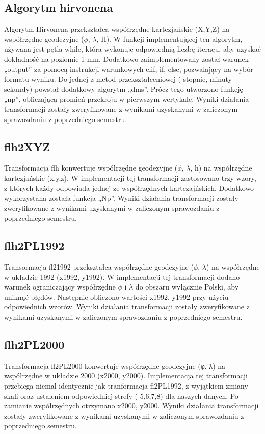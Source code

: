 \documentclass[10pt,a4paper]{article}
\begin{document}
	\subsection{Algorytm hirvonena} 
	Algorytm Hirvonena przekształca współrzędne kartezjańskie (X,Y,Z) na współrzędne geodezyjne ($\phi$, $\lambda$, H). W funkcji implementującej ten algorytm, używana jest pętla while, która wykonuje odpowiednią liczbę iteracji, aby uzyskać dokładność na poziomie 1 mm. Dodatkowo zaimplementowany został warunek „output” za pomocą instrukcji warunkowych elif, if, else, pozwalający na wybór formatu wyniku. Do jednej z metod przekształceniowej ( stopnie, minuty sekundy) powstał dodatkowy algorytm „dms”. Prócz tego utworzono funkcję „np”, obliczającą promień przekroju w pierwszym wertykale. Wyniki działania transformacji zostały zweryfikowane z wynikami uzyskanymi w zaliczonym sprawozdaniu z poprzedniego semestru.
	
	\subsection{flh2XYZ}
	Transformacja flh konwertuje współrzędne geodezyjne ($\phi$, $\lambda$, h) na współrzędne kartezjańskie (x,y,z). W implementacji tej transformacji zastosowano trzy wzory, z których każdy odpowiada jednej ze współrzędnych kartezajńskich. Dodatkowo wykorzystana została funkcja „Np”. Wyniki działania transformacji zostały zweryfikowane z wynikami uzyskanymi w zaliczonym sprawozdaniu z poprzedniego semestru.
	
	 

	\subsection{flh2PL1992}
	Transormacja fl21992 przekształca współrzędne geodezyjne ($\phi$, $\lambda$) na współrzędne w układzie 1992 (x1992, y1992). W implementacji tej transformacji dodano warunek ograniczający współrzędne $\phi$ i $\lambda$ do obszaru wyłącznie Polski, aby uniknąć błędów. Następnie obliczono wartości x1992, y1992 przy użyciu odpowiednich wzorów. Wyniki działania transformacji zostały zweryfikowane z wynikami uzyskanymi w zaliczonym sprawozdaniu z poprzedniego semestru.  

	\subsection{flh2PL2000} 
	Transformacja fl2PL2000 konwertuje współrzędne geodezyjne (φ, λ) na współrzędne w układzie 2000 (x2000, y2000). Implementacja tej transformacji przebiega niemal identycznie jak tranformacja fl2PL1992, z wyjątkiem zmiany skali oraz ustaleniem odpowiedniej strefy ( 5,6,7,8) dla naszych danych. Po zamianie współrzędnych otrzymano x2000, y2000. Wyniki działania transformacji zostały zweryfikowane z wynikami uzyskanymi w zaliczonym sprawozdaniu z poprzedniego semestru. 
\end{document}
